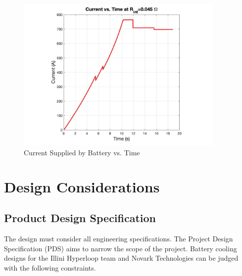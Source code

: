 \documentclass[11pt]{article}
\numberwithin{equation}{subsection} %
\begin{document}
\begin{figure}[!htb]
    \centering
    \includegraphics[width=0.9\textwidth]{fig/current.jpg}
    \caption{Current Supplied by Battery vs. Time}
    \label{fig:current}
\end{figure}

\section{Design Considerations}
\subsection{Product Design Specification}

The design must consider all engineering specifications. The Project Design Specification (PDS) aims to narrow the scope of the project. Battery cooling designs for the Illini Hyperloop team and Novark Technologies can be judged with the following constraints.
\end{document}
